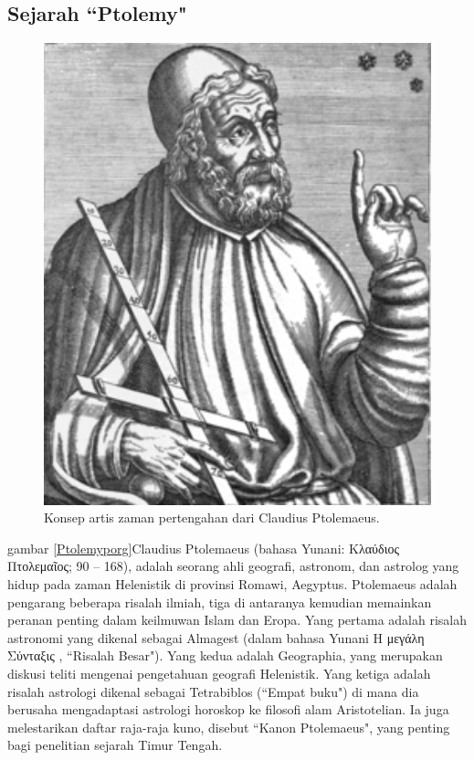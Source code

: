 	\subsection{Sejarah ``Ptolemy"}
	\begin{figure} [ht]
	\centerline{\includegraphics[width=1\textwidth]{figures/Ptolemyporg.PNG}}
	\caption{Konsep artis zaman pertengahan dari Claudius Ptolemaeus.}
	\end{figure}
    gambar \ref{Ptolemyporg}Claudius Ptolemaeus (bahasa Yunani: Κλαύδιος Πτολεμαῖος; 90 – 168), adalah seorang ahli geografi, astronom, dan astrolog yang hidup pada zaman Helenistik di provinsi Romawi, Aegyptus.
    Ptolemaeus adalah pengarang beberapa risalah ilmiah, tiga di antaranya kemudian memainkan peranan penting dalam keilmuwan Islam dan Eropa. Yang pertama adalah risalah astronomi yang dikenal sebagai Almagest (dalam bahasa Yunani Η μεγάλη Σύνταξις , ``Risalah Besar"). Yang kedua adalah Geographia, yang merupakan diskusi teliti mengenai pengetahuan geografi Helenistik. Yang ketiga adalah risalah astrologi dikenal sebagai Tetrabiblos (``Empat buku") di mana dia berusaha mengadaptasi astrologi horoskop ke filosofi alam Aristotelian. Ia juga melestarikan daftar raja-raja kuno, disebut ``Kanon Ptolemaeus", yang penting bagi penelitian sejarah Timur Tengah.
